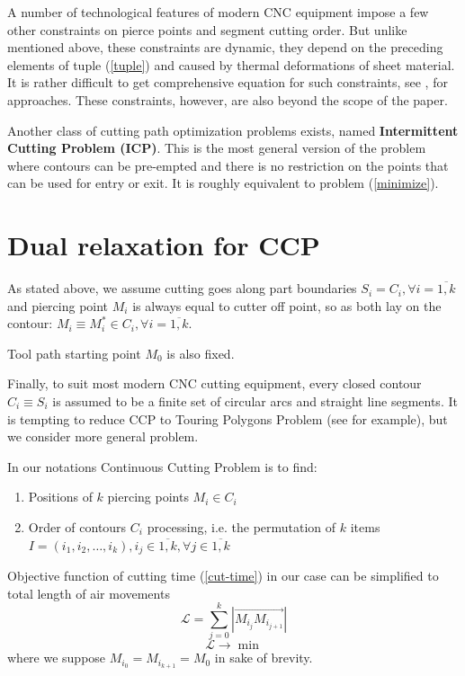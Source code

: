 \documentclass{ifacconf}
\begin{document}
A number of technological features of modern CNC equipment
impose a few other constraints on
pierce points and segment cutting order.
But unlike mentioned above,
these constraints are dynamic,
they depend on the preceding elements
of tuple (\ref{tuple})
and caused by
thermal deformations of sheet material.
It is rather difficult to get comprehensive
equation for such constraints,
see \cite{chentsov2013dynamic}, \cite{chentsov2015model} for approaches.
These constraints, however,
are also beyond the scope of the paper.

Another class of cutting path optimization problems exists,
named \textbf{Intermittent Cutting Problem (ICP)}.
This is the most general version of the problem
where contours can be pre-empted and there is
no restriction on the points that can be used for entry or exit.
It is roughly equivalent to problem (\ref{minimize}).

\section{Dual relaxation for CCP}
As stated above,
we assume cutting goes along part boundaries
$S_i = C_i, \forall i=\overline{1, k}$
and piercing point $M_i$ is always equal to
cutter off point,
so as both lay on the contour:
$M_i \equiv M_i^* \in C_i, \forall i = \overline{1, k}$.

Tool path starting point $M_0$ is also fixed.

Finally,
to suit most modern CNC cutting equipment,
every closed contour $C_i \equiv S_i$
is assumed to be
a finite set of circular arcs
and straight line segments.
It is tempting to reduce
CCP to
Touring Polygons Problem
(see \cite{Qin2017Nov} for example),
but we consider more general problem.

In our notations Continuous Cutting Problem is to find:
\begin{enumerate}
  \item Positions of $k$ piercing points $M_i \in C_i$
  \item Order of contours $C_i$ processing,
  i.e. the permutation of $k$ items
  $I=(i_1, i_2, \dots, i_k),
    i_j \in \overline{1,k}, \forall j \in \overline{1,k}$
\end{enumerate}
Objective function of cutting time (\ref{cut-time})
in our case can be simplified to total length of air movements
$$
\mathcal L = \sum_{j=0}^k |\overrightarrow{M_{i_j} M_{i_{{j+1}}}}|
$$
$$
\mathcal L \to \min
$$
where we suppose
$M_{i_0} = M_{i_{k+1}} = M_0$
in sake of brevity.
\end{document}
